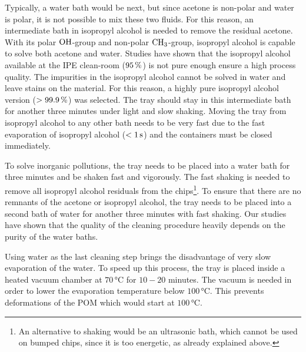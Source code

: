 Typically, a water bath would be next, but since acetone is non-polar and water is polar, it is not possible to mix these two fluids. For this reason, an intermediate bath in isopropyl alcohol is needed to remove the residual acetone. With its polar $\rm{OH}$-group and non-polar $\rm{CH}_{\rm{3}}$-group, isopropyl alcohol is capable to solve both acetone and water. Studies have shown that the isopropyl alcohol available at the \ac{IPE} clean-room ($95\,\rm{\%}$) is not pure enough ensure a high process quality. The impurities in the isopropyl alcohol cannot be solved in water and leave stains on the material. For this reason, a highly pure isopropyl alcohol version ($>99.9\,\rm{\%}$) \cite{BAS14} was selected. The tray should stay in this intermediate bath for another three minutes under light and slow shaking. Moving the tray from isopropyl alcohol to any other bath needs to be very fast due to the fast evaporation of isopropyl alcohol ($<1\,\rm{s}$) and the containers must be closed immediately.

To solve inorganic pollutions, the tray needs to be placed into a water bath for three minutes and be shaken fast and vigorously. The fast shaking is needed to remove all isopropyl alcohol residuals from the chips\footnote{An alternative to shaking would be an ultrasonic bath, which cannot be used on bumped chips, since it is too energetic, as already explained above.}. To ensure that there are no remnants of the acetone or isopropyl alcohol, the tray needs to be placed into a second bath of water for another three minutes with fast shaking. Our studies have shown that the quality of the cleaning procedure heavily depends on the purity of the water baths.

Using water as the last cleaning step brings the disadvantage of very slow evaporation of the water. To speed up this process, the tray is placed inside a heated vacuum chamber at $70\,\si{\degreeCelsius}$ for $10-20$ minutes. The vacuum is needed in order to lower the evaporation temperature below $100\,\si{\degreeCelsius}$. This prevents deformations of the \acs{POM} which would start at $100\,\si{\degreeCelsius}$.

